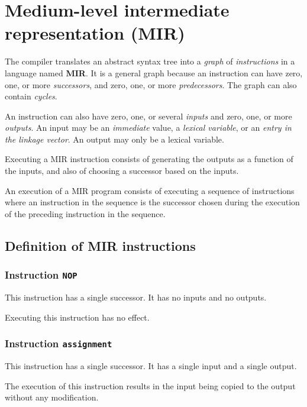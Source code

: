 \chapter{Medium-level intermediate representation (MIR)}
\label{chap-mir}

The compiler translates an abstract syntax tree into a \emph{graph} of
\emph{instructions} in a language named \textbf{MIR}.  It is a general
graph because an instruction can have zero, one, or more
\emph{successors}, and zero, one, or more \emph{predecessors}.  The
graph can also contain \emph{cycles}.  

An instruction can also have zero, one, or several \emph{inputs} and
zero, one, or more \emph{outputs}.  An input may be an
\emph{immediate} value, a \emph{lexical variable}, or an \emph{entry
  in the linkage vector}.  An output may only be a lexical variable.

Executing a MIR instruction consists of generating the outputs as a
function of the inputs, and also of choosing a successor based on the
inputs.

An execution of a MIR program consists of executing a sequence of
instructions where an instruction in the sequence is the successor
chosen during the execution of the preceding instruction in the
sequence.

\section{Definition of MIR instructions}

\subsection{Instruction \texttt{NOP}}
\label{mir-instruction-NOP}

This instruction has a single successor.  It has no inputs and no
outputs.

Executing this instruction has no effect. 

\subsection{Instruction \texttt{assignment}}
\label{mir-instruction-assignment}

This instruction has a single successor.  It has a single input and a
single output. 

The execution of this instruction results in the input being copied to
the output without any modification. 


